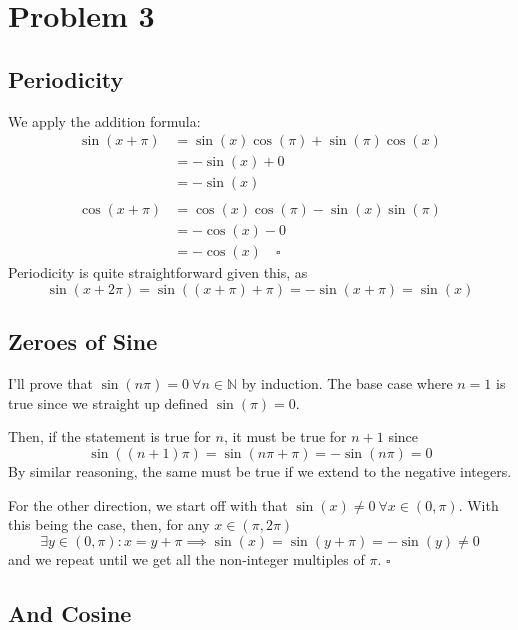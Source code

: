 \documentclass[12pt]{article}
\newcommand{\N}{\mathbb{N}}
\begin{document}
\setcounter{section}{2}

\section{Problem 3}

\subsection{Periodicity}\label{sec:p3p1}

We apply the addition formula:
\begin{align*}
  \sin(x+\pi)
   & = \sin(x)\cos(\pi) + \sin(\pi)\cos(x) \\
   & = -\sin(x) + 0                        \\
   & = -\sin(x)                            \\ \\
  \cos(x+\pi)
   & = \cos(x)\cos(\pi)-\sin(x)\sin(\pi)   \\
   & = -\cos(x) - 0                        \\
   & = -\cos(x)\quad\square
\end{align*}
Periodicity is quite straightforward given this, as
\[\sin(x+2\pi)=\sin((x+\pi)+\pi)=-\sin(x+\pi)=\sin(x)\]

\subsection{Zeroes of Sine}

I'll prove that $\sin(n\pi)=0\ \forall n \in \N$ by induction.
The base case where $n=1$ is true since we straight up defined $\sin(\pi)=0$.

Then, if the statement is true for $n$, it must be true for $n+1$ since
\[\sin((n+1)\pi)=\sin(n\pi+\pi)=-\sin(n\pi)=0\]
By similar reasoning, the same must be true if we extend to the negative integers.

For the other direction, we start off with that $\sin(x) \ne 0\ \forall x \in (0, \pi)$.
With this being the case, then, for any $x \in (\pi, 2\pi)$
\[\exists y \in (0, \pi): x=y+\pi \implies \sin(x)=\sin(y+\pi)=-\sin(y) \ne 0\]
and we repeat until we get all the non-integer multiples of $\pi$. $\square$

\pagebreak

\subsection{And Cosine}\label{sec:p3p3}
\end{document}
